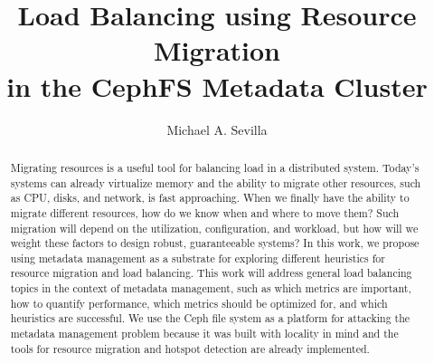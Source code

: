 \title{Load Balancing using Resource Migration\\in the CephFS Metadata Cluster}
\author{Michael A. Sevilla}
\deanlinethree{}

\begin{frontmatter}
	\maketitle\copyrightpage\tableofcontents\listoffigures\listoftables
	\begin{abstract}
		Migrating resources is a useful tool for balancing load in a distributed system. Today's systems can already virtualize memory and the ability to migrate other resources, such as CPU, disks, and network, is fast approaching. When we finally have the ability to migrate different resources, how do we know when and where to move them? Such migration will depend on the utilization, configuration, and workload, but how will we weight these factors to design robust, guaranteeable systems? In this work, we propose using metadata management as a substrate for exploring different heuristics for resource migration and load balancing. This work will address general load balancing topics in the context of metadata management, such as which metrics are important, how to quantify performance, which metrics should be optimized for, and which heuristics are successful. We use the Ceph file system as a platform for attacking the metadata management problem because it was built with locality in mind and the tools for resource migration and hotspot detection are already implemented.
	\end{abstract}
\end{frontmatter}


